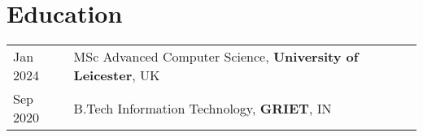 \documentclass[a4paper,12pt]{article}
\begin{document}
\section{Education}
\begin{tabularx}{\linewidth}{@{}l X@{}} 	
Jan 2024 & MSc Advanced Computer Science, \textbf{University of Leicester}, UK \\
Sep 2020 & B.Tech Information Technology, \textbf{GRIET}, IN \\
\end{tabularx}
\end{document}
